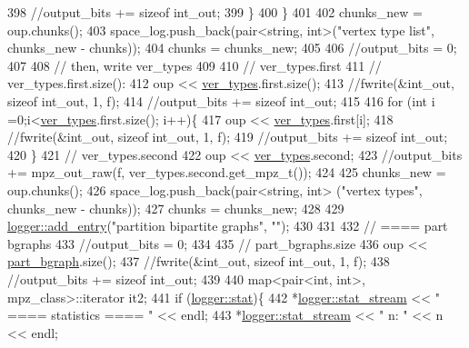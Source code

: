 \begin{DoxyCode}
398       \textcolor{comment}{//output\_bits += sizeof int\_out;}
399     \}
400   \}
401 
402   chunks\_new = oup.chunks();
403   space\_log.push\_back(pair<string, int>(\textcolor{stringliteral}{"vertex type list"}, chunks\_new - chunks));
404   chunks = chunks\_new;
405 
406   \textcolor{comment}{//output\_bits = 0;}
407   
408   \textcolor{comment}{// then, write ver\_types}
409 
410   \textcolor{comment}{// ver\_types.first}
411   \textcolor{comment}{// ver\_types.first.size():}
412   oup << \hyperlink{classmarked__graph__compressed_af446cc5e23c241a92b76642fd5ebc403}{ver\_types}.first.size();
413   \textcolor{comment}{//fwrite(&int\_out, sizeof int\_out, 1, f);}
414   \textcolor{comment}{//output\_bits += sizeof int\_out;}
415 
416   \textcolor{keywordflow}{for} (\textcolor{keywordtype}{int} i =0;i<\hyperlink{classmarked__graph__compressed_af446cc5e23c241a92b76642fd5ebc403}{ver\_types}.first.size(); i++)\{
417     oup <<  \hyperlink{classmarked__graph__compressed_af446cc5e23c241a92b76642fd5ebc403}{ver\_types}.first[i];
418     \textcolor{comment}{//fwrite(&int\_out, sizeof int\_out, 1, f);}
419     \textcolor{comment}{//output\_bits += sizeof int\_out;}
420   \}
421   \textcolor{comment}{// ver\_types.second}
422   oup << \hyperlink{classmarked__graph__compressed_af446cc5e23c241a92b76642fd5ebc403}{ver\_types}.second;
423   \textcolor{comment}{//output\_bits += mpz\_out\_raw(f, ver\_types.second.get\_mpz\_t());}
424 
425   chunks\_new = oup.chunks();
426   space\_log.push\_back(pair<string, int> (\textcolor{stringliteral}{"vertex types"}, chunks\_new - chunks));
427   chunks = chunks\_new;
428 
429   \hyperlink{classlogger_a710163deb17bc81f70d53d285b8ac9ac}{logger::add\_entry}(\textcolor{stringliteral}{"partition bipartite graphs"}, \textcolor{stringliteral}{""});
430   
431 
432   \textcolor{comment}{// ==== part bgraphs}
433   \textcolor{comment}{//output\_bits = 0;}
434 
435   \textcolor{comment}{// part\_bgraphs.size}
436   oup << \hyperlink{classmarked__graph__compressed_a7b3267063fba30b45eb21b3ba4e07536}{part\_bgraph}.size();
437   \textcolor{comment}{//fwrite(&int\_out, sizeof int\_out, 1, f);}
438   \textcolor{comment}{//output\_bits += sizeof int\_out;}
439 
440   map<pair<int, int>, mpz\_class>::iterator it2;
441   \textcolor{keywordflow}{if} (\hyperlink{classlogger_a26812b5ba03f130e8dae3446d5fc032f}{logger::stat})\{
442     *\hyperlink{classlogger_a7db37821f875f2ba3540980b355779f5}{logger::stat\_stream} << \textcolor{stringliteral}{" ==== statistics ==== "} << endl;
443     *\hyperlink{classlogger_a7db37821f875f2ba3540980b355779f5}{logger::stat\_stream} << \textcolor{stringliteral}{" n:                "} << n << endl;

\end{DoxyCode}
